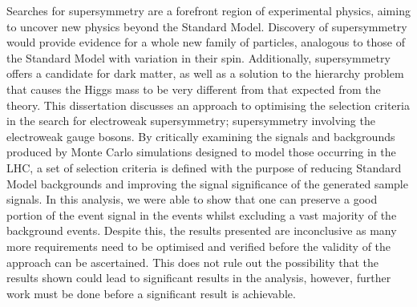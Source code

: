 Searches for supersymmetry are a forefront region of experimental physics, aiming to uncover new physics beyond the Standard Model.
Discovery of supersymmetry would provide evidence for a whole new family of particles, analogous to those of the Standard Model with variation in their spin.
Additionally, supersymmetry offers a candidate for dark matter, as well as a solution to the hierarchy problem that causes the Higgs mass to be very different from that expected from the theory.
This dissertation discusses an approach to optimising the selection criteria in the search for electroweak supersymmetry; supersymmetry involving the electroweak gauge bosons.
By critically examining the signals and backgrounds produced by Monte Carlo simulations designed to model those occurring in the LHC, a set of selection criteria is defined with the purpose of reducing Standard Model backgrounds and improving the signal significance of the generated sample signals.
In this analysis, we were able to show that one can preserve a good portion of the event signal in the events whilst excluding a vast majority of the background events.
Despite this, the results presented are inconclusive as many more requirements need to be optimised and verified before the validity of the approach can be ascertained. 
This does not rule out the possibility that the results shown could lead to significant results in the analysis, however, further work must be done before a significant result is achievable.